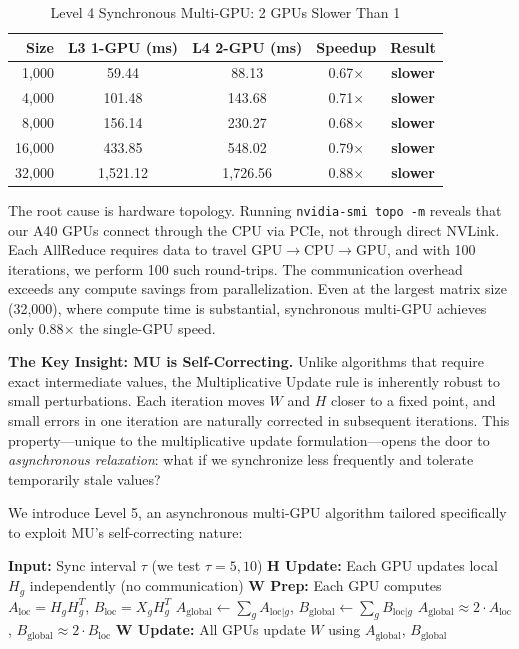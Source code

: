 \documentclass[11pt]{article}
\begin{document}
\begin{table}[h]
\centering
\caption{Level 4 Synchronous Multi-GPU: 2 GPUs Slower Than 1}
\label{tab:l4fail}
\begin{tabular}{@{}rcccc@{}}
\toprule
Size & L3 1-GPU (ms) & L4 2-GPU (ms) & Speedup & Result \\ \midrule
1,000 & 59.44 & 88.13 & 0.67$\times$ & \textbf{slower} \\
4,000 & 101.48 & 143.68 & 0.71$\times$ & \textbf{slower} \\
8,000 & 156.14 & 230.27 & 0.68$\times$ & \textbf{slower} \\
16,000 & 433.85 & 548.02 & 0.79$\times$ & \textbf{slower} \\
32,000 & 1,521.12 & 1,726.56 & 0.88$\times$ & \textbf{slower} \\ \bottomrule
\end{tabular}
\end{table}

The root cause is hardware topology. Running \texttt{nvidia-smi topo -m} reveals that our A40 GPUs connect through the CPU via PCIe, not through direct NVLink. Each AllReduce requires data to travel GPU$\to$CPU$\to$GPU, and with 100 iterations, we perform 100 such round-trips. The communication overhead exceeds any compute savings from parallelization. Even at the largest matrix size (32,000), where compute time is substantial, synchronous multi-GPU achieves only 0.88$\times$ the single-GPU speed.

\textbf{The Key Insight: MU is Self-Correcting.} Unlike algorithms that require exact intermediate values, the Multiplicative Update rule is inherently robust to small perturbations. Each iteration moves $W$ and $H$ closer to a fixed point, and small errors in one iteration are naturally corrected in subsequent iterations. This property---unique to the multiplicative update formulation---opens the door to \textit{asynchronous relaxation}: what if we synchronize less frequently and tolerate temporarily stale values?

We introduce Level 5, an asynchronous multi-GPU algorithm tailored specifically to exploit MU's self-correcting nature:

\begin{algorithm}[H]
\caption{Level 5: Asynchronous Multi-GPU MU (Our Innovation)}
\begin{algorithmic}
\STATE \textbf{Input:} Sync interval $\tau$ (we test $\tau = 5, 10$)
    \STATE \textbf{H Update:} Each GPU updates local $H_g$ independently (no communication)
    \STATE \textbf{W Prep:} Each GPU computes $A_{\text{loc}} = H_g H_g^T$, $B_{\text{loc}} = X_g H_g^T$
        \STATE $A_{\text{global}} \leftarrow \sum_g A_{\text{loc|}g}$, $B_{\text{global}} \leftarrow \sum_g B_{\text{loc|}g}$ 
    \ELSE
        \STATE $A_{\text{global}} \approx 2 \cdot A_{\text{loc}}$, $B_{\text{global}} \approx 2 \cdot B_{\text{loc}}$ 
    \ENDIF
    \STATE \textbf{W Update:} All GPUs update $W$ using $A_{\text{global}}$, $B_{\text{global}}$
\ENDFOR
\end{algorithmic}
\end{algorithm}
\end{document}
